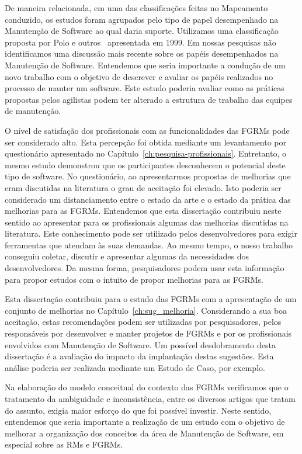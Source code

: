 De maneira relacionada, em uma das classificações feitas no Mapeamento
conduzido, os estudos foram agrupados pelo tipo de papel desempenhado na
Manutenção de Software ao qual daria suporte. Utilizamos uma classificação
proposta por Polo e outros~\cite{Polo1999} apresentada em 1999. Em nossas
pesquisas não identificamos uma discussão mais recente sobre os papéis
desempenhados na Manutenção de Software. Entendemos que seria importante a
condução de um novo trabalho com o objetivo de descrever e avaliar os papéis
realizados no processo de manter um software. Este estudo poderia avaliar como
as práticas propostas pelos agilistas podem ter alterado a estrutura de trabalho
das equipes de manutenção.

O nível de satisfação dos profissionais com as funcionalidades das FGRMs pode
ser considerado alto. Esta percepção foi obtida mediante um levantamento por
questionário apresentado no Capítulo~\ref{ch:pesquisa-profissionais}.
Entretanto, o mesmo estudo demonstrou que os participantes desconhecem o
potencial deste tipo de software. No questionário, ao apresentarmos propostas de
melhorias que eram discutidas na literatura o grau de aceitação foi elevado.
Isto poderia ser considerado um distanciamento entre o estado da arte e o estado
da prática das melhorias para as FGRMs. Entendemos que esta dissertação
contribuiu neste sentido ao apresentar para os profissionais algumas das
melhorias discutidas na literatura.  Este conhecimento pode ser utilizado pelos
desenvolvedores para exigir ferramentas que atendam às suas demandas. Ao mesmo
tempo, o nosso trabalho conseguiu coletar, discutir e apresentar algumas da
necessidades dos desenvolvedores. Da mesma forma, pesquisadores podem usar esta
informação para propor estudos com o intuito de propor melhorias para as FGRMs.

Esta dissertação contribuiu para o estudo das FGRMs com a apresentação de um
conjunto de melhorias no Capítulo~\ref{ch:sug_melhoria}. Considerando a sua boa
aceitação, estas recomendações podem ser utilizadas por pesquisadores, pelos
responsáveis por desenvolver e manter projetos de FGRMs e por os profissionais
envolvidos com Manutenção de Software. Um possível desdobramento desta
dissertação é a avaliação do impacto da implantação destas sugestões. Esta
análise poderia ser realizada mediante um Estudo de Caso, por exemplo.

Na elaboração do modelo conceitual do contexto das FGRMs verificamos que o
tratamento da ambiguidade e inconsistência, entre os diversos artigos que tratam
do assunto, exigia maior esforço do que foi possível investir. Neste sentido,
entendemos que seria importante a realização de um estudo com o objetivo de
melhorar a organização dos conceitos da área de Manutenção de Software, em
especial sobre as RMs e FGRMs.

